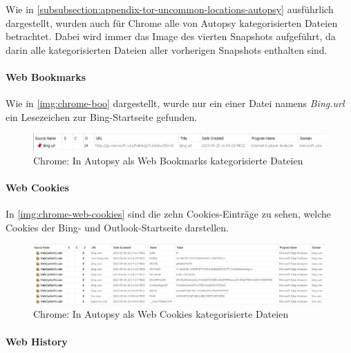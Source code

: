 \begin{appendices}
Wie in \autoref{subsubsection:appendix-tor-uncommon-locations-autopsy} ausführlich dargestellt, wurden auch für Chrome alle von Autopsy kategorisierten Dateien betrachtet. Dabei wird immer das Image des vierten Snapshots aufgeführt, da darin alle kategorisierten Dateien aller vorherigen Snapshots enthalten sind.

\paragraph{Web Bookmarks}\label{chap:anhang-chrome-uncommon-autopsy-web-bookmarks}
Wie in \autoref{img:chrome-boo} dargestellt, wurde nur ein einer Datei namens \textit{Bing.url} ein Lesezeichen zur Bing-Startseite gefunden.

\begin{figure}[ht]
	\centering
	\includegraphics[width=\textwidth]{bilder/CHBoo.png}
	\caption{Chrome: In Autopsy als \glqq{}Web Bookmarks\grqq{} kategorisierte Dateien}
	\label{img:chrome-boo}
\end{figure}

\paragraph*{Web Cookies}\label{chap:anhang-chrome-uncommon-autopsy-web-cookies}
In \autoref{img:chrome-web-cookies} sind die zehn Cookies-Einträge zu sehen, welche Cookies der Bing- und Outlook-Startseite darstellen. 

\begin{figure}[ht]
	\centering
	\includegraphics[width=\textwidth]{bilder/CHCoo.png}
	\caption{Chrome: In Autopsy als \glqq{}Web Cookies\grqq{} kategorisierte Dateien}
	\label{img:chrome-web-cookies}  
\end{figure}

\paragraph*{Web History}\label{chap:anhang-chrome-uncommon-autopsy-web-history}


\end{appendices}

